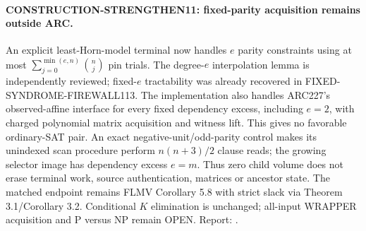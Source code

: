 \paragraph{CONSTRUCTION-STRENGTHEN11: fixed-parity acquisition remains outside ARC.}
An explicit least-Horn-model terminal now handles $e$ parity constraints
using at most $\sum_{j=0}^{\min(e,n)}\binom nj$ pin trials. The degree-$e$
interpolation lemma is independently reviewed; fixed-$e$ tractability was
already recovered in FIXED-SYNDROME-FIREWALL113. The implementation also
handles ARC227's observed-affine interface for every fixed dependency excess,
including $e=2$, with charged polynomial matrix acquisition and witness lift.
This gives no favorable ordinary-SAT pair. An exact negative-unit/odd-parity
control makes its unindexed scan procedure perform $n(n+3)/2$ clause reads;
the growing selector image has dependency excess $e=m$. Thus zero child
volume does not erase terminal work, source authentication, matrices or
ancestor state. The matched endpoint remains FLMV Corollary 5.8 with strict
slack via Theorem 3.1/Corollary 3.2. Conditional $K$ elimination is unchanged;
all-input WRAPPER acquisition and P versus NP remain OPEN. Report:
.
